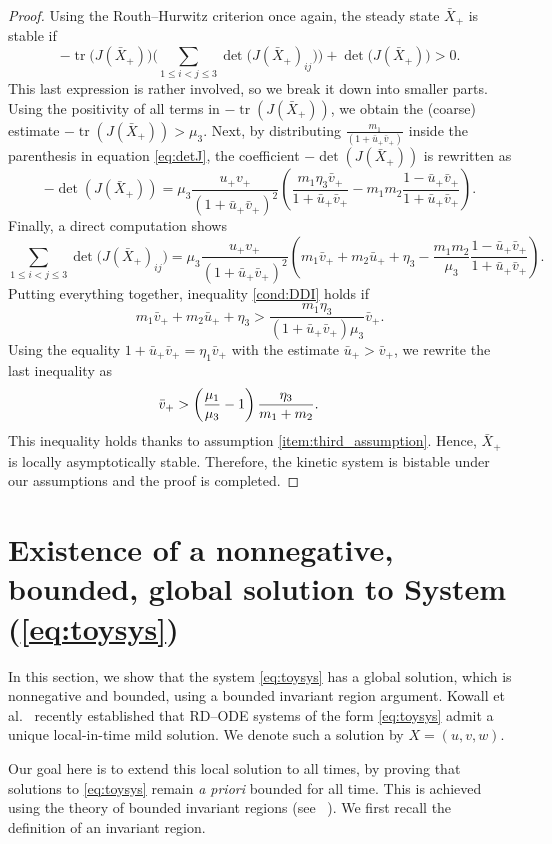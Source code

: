 \documentclass[12pt, a4paper]{amsart}
\numberwithin{equation}{section}
\newcommand{\CSS}{\bar{X}}
\def\be{\begin{equation}}
\def\ee{\end{equation}}
\def\lp{\left(}
\def\rp{\right)}
\DeclareMathOperator{\tr}{tr}
\begin{document}
\begin{proof}
Using the Routh--Hurwitz criterion once again, the steady state $\CSS_+$ is stable if
\be\label{cond:DDI}-\tr \bigl( J(\CSS_+) \bigr) \biggl(\sum_{1 \le i < j \le 3} \det \bigl( J(\CSS_+)_{ij} \bigr) \biggr) + \det \bigl( J(\CSS_+) \bigr) > 0.\ee
This last expression is rather involved, so we break it down into smaller parts. Using the positivity of all terms in $-\tr(J(\CSS_+))$, we obtain the (coarse) estimate $-\tr(J(\CSS_+)) > \mu_3$.
Next, by distributing $\frac{m_1}{(1 + \bar u_+ \bar v_+)}$ inside the parenthesis in equation \eqref{eq:detJ}, the coefficient $-\det(J(\CSS_+))$ is rewritten as
$$-\det(J(\CSS_+)) = \mu_3 \dfrac{u_+ v_+}{(1 + \bar u_+ \bar v_+)^2} \lp \dfrac{m_1 \eta_3 \bar v_+}{1 + \bar u_+ \bar v_+} - m_1 m_2 \dfrac{1- \bar u_+ \bar v_+}{1 + \bar u_+ \bar v_+}\rp.$$
Finally, a direct computation shows
$$\sum_{1 \le i < j \le 3} \det \bigl( J(\CSS_+)_{ij} \bigr) = \mu_3 \dfrac{u_+ v_+}{(1 + \bar u_+ \bar v_+)^2} \lp m_1 \bar v_+ + m_2 \bar u_+ + \eta_3 - \dfrac{m_1 m_2}{\mu_3} \dfrac{1- \bar u_+ \bar v_+}{1 + \bar u_+ \bar v_+} \rp.$$
Putting everything together, inequality \eqref{cond:DDI} holds if
$$m_1 \bar v_+ + m_2 \bar u_+ + \eta_3 > \dfrac{m_1 \eta_3}{(1 + \bar u_+ \bar v_+) \mu_3} \bar v_+.$$
Using the equality $1 + \bar u_+ \bar v_+ = \eta_1 \bar v_+$ with the estimate $\bar u_+ > \bar v_+$, we rewrite the last inequality as
\be\hspace{-3em} \bar v_+ > \lp \dfrac{\mu_1}{\mu_3} - 1 \rp\dfrac{\eta_3}{m_1 + m_2}.\ee
This inequality holds thanks to assumption \ref{item:third_assumption}.
Hence, $\CSS_+$ is locally asymptotically stable. Therefore, the kinetic system is bistable under our assumptions and the proof is completed.
\end{proof}



\section{Existence of a nonnegative, bounded, global solution to System (\ref{eq:toysys})}
\label{app2}

In this section, we show that the system \eqref{eq:toysys} has a global solution, which is nonnegative and bounded, using a bounded invariant region argument. Kowall et al.~\cite[Proposition C.2]{KMMü23} recently established that RD--ODE systems of the form \eqref{eq:toysys} admit a unique local-in-time mild solution.
We denote such a solution by $X = (u,v,w)$.

Our goal here is to extend this local solution to all times, by proving that solutions to \eqref{eq:toysys} remain \textit{a priori} bounded for all time.
This is achieved using the theory of bounded invariant regions (see ~\cite[Chap. 14, \S B]{Smoller1983}). We first recall the definition of an invariant region.
\end{document}
